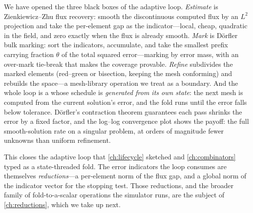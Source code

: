 We have opened the three black boxes of the adaptive loop. \emph{Estimate} is
Zienkiewicz--Zhu flux recovery: smooth the discontinuous computed flux by an $L^2$
projection and take the per-element gap as the indicator---local, cheap, quadratic in
the field, and zero exactly when the flux is already smooth. \emph{Mark} is
D\"orfler bulk marking: sort the indicators, accumulate, and take the smallest prefix
carrying fraction $\theta$ of the total squared error---marking by error mass, with an
over-mark tie-break that makes the coverage provable. \emph{Refine} subdivides the
marked elements (red--green or bisection, keeping the mesh conforming) and rebuilds the
space---a mesh-library operation we treat as a boundary. And the whole loop is a
 whose schedule is \emph{generated from its own state}: the next
mesh is computed from the current solution's error, and the fold runs until the error
falls below tolerance. D\"orfler's contraction theorem guarantees each pass shrinks
the error by a fixed factor, and the log--log convergence plot shows the payoff: the
full smooth-solution rate on a singular problem, at orders of magnitude fewer
unknowns than uniform refinement.

This closes the adaptive loop that \cref{ch:lifecycle} sketched and
\cref{ch:combinators} typed as a state-threaded fold. The error indicators the loop
consumes are themselves \emph{reductions}---a per-element norm of the flux gap, and a
global norm of the indicator vector for the stopping test. Those reductions, and the
broader family of fold-to-a-scalar operations the simulator runs, are the subject of
\cref{ch:reductions}, which we take up next.

